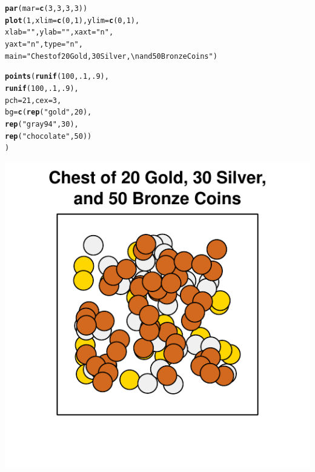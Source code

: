 \documentclass{tufte-book}\usepackage[]{graphicx}\usepackage[]{color}
\makeatletter
\def\maxwidth{ %
  \ifdim\Gin@nat@width>\linewidth
    \linewidth
  \else
    \Gin@nat@width
  \fi
}
\newcommand{\hlnum}[1]{\textcolor[rgb]{0.686,0.059,0.569}{#1}}%
\newcommand{\hlstr}[1]{\textcolor[rgb]{0.192,0.494,0.8}{#1}}%
\newcommand{\hlstd}[1]{\textcolor[rgb]{0.345,0.345,0.345}{#1}}%
\newcommand{\hlkwc}[1]{\textcolor[rgb]{0.333,0.667,0.333}{#1}}%
\newcommand{\hlkwd}[1]{\textcolor[rgb]{0.737,0.353,0.396}{\textbf{#1}}}%
\newenvironment{kframe}{%
 \def\at@end@of@kframe{}%
 \ifinner\ifhmode%
  \def\at@end@of@kframe{\end{minipage}}%
  \begin{minipage}{\columnwidth}%
 \fi\fi%
 \def\FrameCommand##1{\hskip\@totalleftmargin \hskip-\fboxsep
 \colorbox{shadecolor}{##1}\hskip-\fboxsep
     \hskip-\linewidth \hskip-\@totalleftmargin \hskip\columnwidth}%
 \MakeFramed {\advance\hsize-\width
   \@totalleftmargin\z@ \linewidth\hsize
   \@setminipage}}%
 {\par\unskip\endMakeFramed%
 \at@end@of@kframe}
\newenvironment{knitrout}{}{} %
\makeatother
\begin{document}
\begin{marginfigure}
\begin{tiny}
\begin{knitrout}
\color{fgcolor}\begin{kframe}
\begin{alltt}
\hlkwd{par}\hlstd{(}\hlkwc{mar} \hlstd{=} \hlkwd{c}\hlstd{(}\hlnum{3}\hlstd{,} \hlnum{3}\hlstd{,} \hlnum{3}\hlstd{,} \hlnum{3}\hlstd{))}
\hlkwd{plot}\hlstd{(}\hlnum{1}\hlstd{,} \hlkwc{xlim} \hlstd{=} \hlkwd{c}\hlstd{(}\hlnum{0}\hlstd{,} \hlnum{1}\hlstd{),} \hlkwc{ylim} \hlstd{=} \hlkwd{c}\hlstd{(}\hlnum{0}\hlstd{,} \hlnum{1}\hlstd{),}
     \hlkwc{xlab} \hlstd{=} \hlstr{""}\hlstd{,} \hlkwc{ylab} \hlstd{=} \hlstr{""}\hlstd{,} \hlkwc{xaxt} \hlstd{=} \hlstr{"n"}\hlstd{,}
     \hlkwc{yaxt} \hlstd{=} \hlstr{"n"}\hlstd{,} \hlkwc{type} \hlstd{=} \hlstr{"n"}\hlstd{,}
     \hlkwc{main} \hlstd{=} \hlstr{"Chest of 20 Gold, 30 Silver,\textbackslash{}nand 50 Bronze Coins"}\hlstd{)}

\hlkwd{points}\hlstd{(}\hlkwd{runif}\hlstd{(}\hlnum{100}\hlstd{,} \hlnum{.1}\hlstd{,} \hlnum{.9}\hlstd{),}
       \hlkwd{runif}\hlstd{(}\hlnum{100}\hlstd{,} \hlnum{.1}\hlstd{,} \hlnum{.9}\hlstd{),}
       \hlkwc{pch} \hlstd{=} \hlnum{21}\hlstd{,} \hlkwc{cex} \hlstd{=} \hlnum{3}\hlstd{,}
       \hlkwc{bg} \hlstd{=} \hlkwd{c}\hlstd{(}\hlkwd{rep}\hlstd{(}\hlstr{"gold"}\hlstd{,} \hlnum{20}\hlstd{),}
              \hlkwd{rep}\hlstd{(}\hlstr{"gray94"}\hlstd{,} \hlnum{30}\hlstd{),}
              \hlkwd{rep}\hlstd{(}\hlstr{"chocolate"}\hlstd{,} \hlnum{50}\hlstd{))}
       \hlstd{)}
\end{alltt}
\end{kframe}
\includegraphics[width=\maxwidth]{figure/unnamed-chunk-45-1} 

\end{knitrout}
\end{tiny}
\end{marginfigure}
\end{document}
